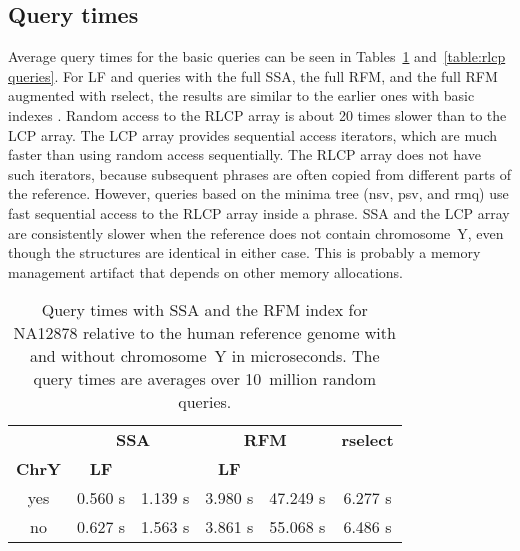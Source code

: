 \documentclass[a4paper,11pt]{llncs}
\newcommand{\SSA}{\textsf{SSA}}
\newcommand{\RFM}{\textsf{RFM}}
\newcommand{\LCP}{\textsf{LCP}}
\newcommand{\RLCP}{\textsf{RLCP}}
\newcommand{\rselect}{\textsf{rselect}}
\newcommand{\LF}{\textsf{LF}}
\newcommand{\Psiop}{\textsf{\textPsi}}
\newcommand{\nsv}{\textsf{nsv}}
\newcommand{\psv}{\textsf{psv}}
\newcommand{\rmq}{\textsf{rmq}}
\newcommand{\mus}{\textmu{}s}
\begin{document}
\subsection{Query times}

Average query times for the basic queries can be seen in Tables~\ref{table:rfm
queries} and~\ref{table:rlcp queries}. For \LF{} and \Psiop{} queries
with the full \SSA{}, the full \RFM, and the full \RFM{} augmented with
\rselect, the results are similar to the earlier ones with basic indexes
\cite{Boucher2015}. Random access to the \RLCP{} array is about 20 times
slower than to the \LCP{} array. The \LCP{} array provides sequential access
iterators, which are much faster than using random access sequentially. The
\RLCP{} array does not have such iterators, because subsequent phrases are
often copied from different parts of the reference. However, queries based on
the minima tree (\nsv, \psv, and \rmq) use fast sequential access to the
\RLCP{} array inside a phrase. \SSA{} and the \LCP{} array are consistently
slower when the reference does not contain chromosome~Y, even though the
structures are identical in either case. This is probably a memory management
artifact that depends on other memory allocations.

\begin{table}
\caption{Query times with \SSA{} and the \RFM{} index for NA12878 relative to
the human reference genome with and without chromosome~Y in microseconds. The
query times are averages over 10~million random queries.}\label{table:rfm
queries}
\setlength{\extrarowheight}{2pt}
\setlength{\tabcolsep}{3pt}
\begin{center}
\begin{tabular}{c|cc|cc|c}
\hline
 & \multicolumn{2}{c|}{\textbf{\SSA}} & \multicolumn{2}{c|}{\textbf{\RFM}} &
\textbf{\rselect} \\
\textbf{ChrY} & \textbf{\LF} & \textbf{\Psiop} & \textbf{\LF} &
\textbf{\Psiop} & \textbf{\Psiop} \\
\hline
yes & 0.560 \mus & 1.139 \mus & 3.980 \mus & 47.249 \mus & 6.277 \mus \\
no  & 0.627 \mus & 1.563 \mus & 3.861 \mus & 55.068 \mus & 6.486 \mus \\
\hline
\end{tabular}
\end{center}
\end{table}
\end{document}

